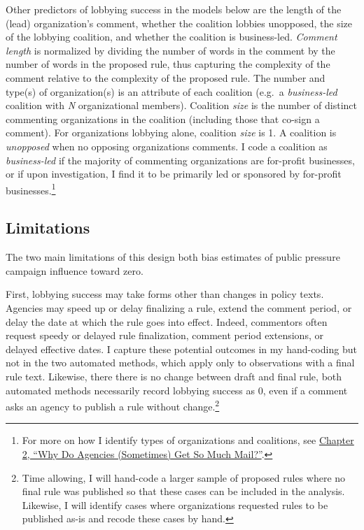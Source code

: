 \documentclass[
]{book}
\begin{document}
Other predictors of lobbying success in the models below are the length of the (lead) organization's comment, whether the coalition lobbies unopposed, the size of the lobbying coalition, and whether the coalition is business-led. \emph{Comment length} is normalized by dividing the number of words in the comment by the number of words in the proposed rule, thus capturing the complexity of the comment relative to the complexity of the proposed rule. The number and type(s) of organization(s) is an attribute of each coalition (e.g.~a \emph{business-led} coalition with \emph{N} organizational members). Coalition \emph{size} is the number of distinct commenting organizations in the coalition (including those that co-sign a comment). For organizations lobbying alone, coalition \emph{size} is 1. A coalition is \emph{unopposed} when no opposing organizations comments. I code a coalition as \emph{business-led} if the majority of commenting organizations are for-profit businesses, or if upon investigation, I find it to be primarily led or sponsored by for-profit businesses.\footnote{For more on how I identify types of organizations and coalitions, see \href{https://judgelord.github.io/research/whymail/}{Chapter 2, ``Why Do Agencies (Sometimes) Get So Much Mail?''}.}

\hypertarget{limitations}{%
\subsection{Limitations}\label{limitations}}

The two main limitations of this design both bias estimates of public pressure campaign influence toward zero.

First, lobbying success may take forms other than changes in policy texts. Agencies may speed up or delay finalizing a rule, extend the comment period, or delay the date at which the rule goes into effect. Indeed, commentors often request speedy or delayed rule finalization, comment period extensions, or delayed effective dates. I capture these potential outcomes in my hand-coding but not in the two automated methods, which apply only to observations with a final rule text. Likewise, there there is no change between draft and final rule, both automated methods necessarily record lobbying success as 0, even if a comment asks an agency to publish a rule without change.\footnote{Time allowing, I will hand-code a larger sample of proposed rules where no final rule was published so that these cases can be included in the analysis. Likewise, I will identify cases where organizations requested rules to be published as-is and recode these cases by hand.}
\end{document}
